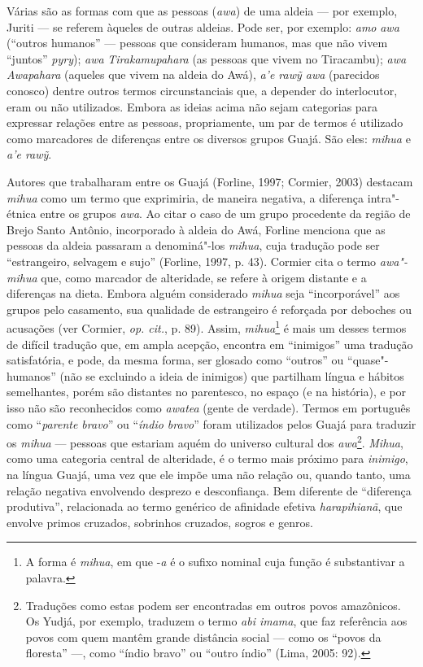 Várias são as formas com que as pessoas (\emph{awa}) de uma aldeia --- por
exemplo, Juriti --- se referem àqueles de outras aldeias. Pode ser, por
exemplo: \emph{amo} \emph{awa} (``outros humanos'' --- pessoas que
consideram humanos, mas que não vivem ``juntos'' \emph{pyry}); \emph{awa}
\emph{Tirakamupahara} (as pessoas que vivem no  Tiracambu); \emph{awa
Awapahara} (aqueles que vivem na aldeia do  Awá), \emph{a'e rawỹ awa}
(parecidos conosco) dentre outros termos circunstanciais que, a depender
do interlocutor, eram ou não utilizados. Embora as ideias acima não
sejam categorias para expressar relações entre as pessoas, propriamente,
um par de termos é utilizado como marcadores de diferenças entre os
diversos grupos Guajá. São eles: \emph{mihua} e \emph{a'e rawỹ}.

Autores que trabalharam entre os Guajá (Forline, 1997; Cormier, 2003)
destacam \emph{mihua} como um termo que exprimiria, de maneira negativa,
a diferença intra"-étnica entre os grupos \emph{awa}. Ao citar o caso de
um grupo procedente da região de Brejo Santo Antônio, incorporado à
aldeia do  Awá, Forline menciona que as pessoas da aldeia passaram a
denominá"-los \emph{mihua}, cuja tradução pode ser ``estrangeiro, selvagem
e sujo'' (Forline, 1997, p. 43). Cormier cita o termo \emph{awa"-mihua}
que, como marcador de alteridade, se refere à origem distante e a
diferenças na dieta. Embora alguém considerado \emph{mihua} seja
``incorporável'' aos grupos pelo casamento, sua qualidade de estrangeiro é
reforçada por deboches ou acusações (ver Cormier, \emph{op. cit.}, p. 89).
Assim, \emph{mihua}\footnote{A forma é \emph{mihua}, em que -\emph{a} é
  o sufixo nominal cuja função é substantivar a palavra.} é mais um
desses termos de difícil tradução que, em ampla acepção, encontra em
``inimigos'' uma tradução satisfatória, e pode, da mesma forma, ser
glosado como ``outros'' ou ``quase"-humanos'' (não se excluindo a ideia
de inimigos) que partilham língua e hábitos semelhantes, porém são
distantes no parentesco, no espaço (e na história), e por isso não são
reconhecidos como \emph{awatea} (gente de verdade). Termos em português
como ``\emph{parente bravo}'' ou ``\emph{índio bravo}'' foram utilizados
pelos Guajá para traduzir os \emph{mihua} --- pessoas que estariam aquém
do universo cultural dos \emph{awa}\footnote{Traduções como estas podem
  ser encontradas em outros povos amazônicos. Os Yudjá, por exemplo,
  traduzem o termo \emph{abi imama}, que faz referência aos povos com
  quem mantêm grande distância social --- como os ``povos da floresta'' ---,
  como ``índio bravo'' ou ``outro índio'' (Lima, 2005: 92).}. \emph{Mihua},
como uma categoria central de alteridade, é o termo mais próximo para
\emph{inimigo}, na língua Guajá, uma vez que ele impõe uma não relação
ou, quando tanto, uma relação negativa envolvendo desprezo e
desconfiança. Bem diferente de ``diferença produtiva'', relacionada ao
termo genérico de afinidade efetiva \emph{harapihianã}, que envolve
primos cruzados, sobrinhos cruzados, sogros e genros.

